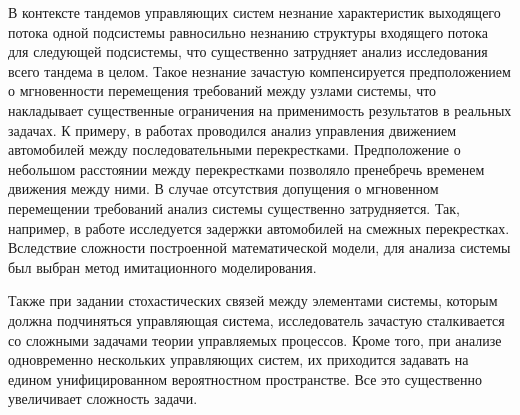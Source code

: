 В контексте тандемов управляющих систем незнание характеристик выходящего потока одной подсистемы равносильно незнанию структуры входящего потока для следующей подсистемы, что существенно затрудняет анализ исследования всего тандема в целом. Такое незнание зачастую компенсируется предположением о мгновенности перемещения требований между узлами системы, что накладывает существенные ограничения на применимость результатов в реальных задачах. К примеру, в работах \cite{AfanasyevaBulinskaya:2010, AfanasyevaBulinskaya:2011} проводился анализ управления движением автомобилей между последовательными перекрестками. Предположение о небольшом расстоянии между перекрестками позволяло пренебречь временем движения между ними.  В случае отсутствия допущения о мгновенном перемещении требований анализ системы существенно затрудняется. Так, например, в работе \cite{Yamada} исследуется задержки автомобилей на смежных перекрестках. Вследствие сложности построенной математической модели, для анализа системы был выбран метод имитационного моделирования. 

Также при задании стохастических связей между элементами системы, которым должна подчиняться управляющая система, исследователь зачастую сталкивается со сложными задачами теории управляемых процессов. Кроме того, при анализе одновременно нескольких управляющих систем, их приходится задавать на едином унифицированном вероятностном пространстве. Все это существенно увеличивает сложность задачи.

